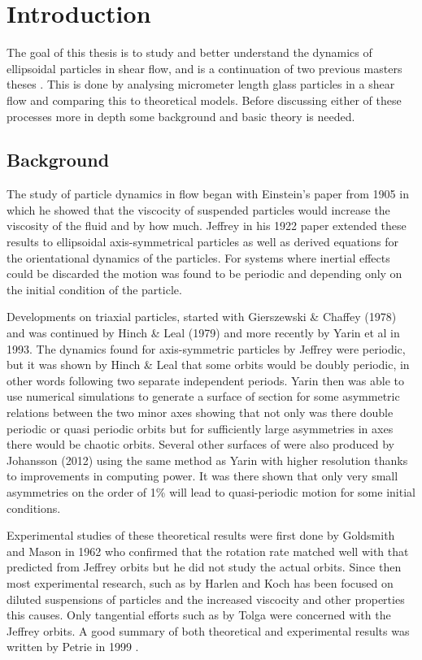 \section{Introduction}
The goal of this thesis is to study and better understand the dynamics of ellipsoidal particles in shear flow, and is a continuation of two previous masters theses \cite{AntonThesis, JonasThesis}. This is done by analysing micrometer length glass particles in a shear flow and comparing this to theoretical models. Before discussing either of these processes more in depth some background and basic theory is needed.

\subsection{Background}
The study of particle dynamics in flow began with Einstein's paper from 1905 \cite{Einstein} in which he showed that the viscocity of suspended particles would increase the viscosity of the fluid and by how much. Jeffrey in his 1922 paper \cite{Jeffrey} extended these results to ellipsoidal axis-symmetrical particles as well as derived equations for the orientational dynamics of the particles. For systems where inertial effects could be discarded the motion was found to be periodic and depending only on the initial condition of the particle.

Developments on triaxial particles, started with Gierszewski \& Chaffey (1978)\cite{Chaffey} and was continued by Hinch \& Leal (1979)\cite{Leal} and more recently by Yarin et al in 1993\cite{Yarin}. 
The dynamics found for axis-symmetric particles by Jeffrey were periodic, but it was shown by Hinch \& Leal that some orbits would be doubly periodic, in other words following two separate independent periods. 
Yarin then was able to use numerical simulations to generate a surface of section \cite{SurfaceOfSection} for some asymmetric relations between the two minor axes showing that not only was there double periodic or quasi periodic orbits but for sufficiently large asymmetries in axes there would be chaotic orbits. 
Several other surfaces of were also produced by Johansson (2012)\cite{AntonThesis} using the same method as Yarin with higher resolution thanks to improvements in computing power. It was there shown that only very small asymmetries on the order of 1\% will lead to quasi-periodic motion for some initial conditions.

Experimental studies of these theoretical results were first done by Goldsmith and Mason in 1962\cite{Mason} who confirmed that the rotation rate matched well with that predicted from Jeffrey orbits but he did not study the actual orbits. Since then most experimental research, such as by Harlen and Koch\cite{fibersspension} has been focused on diluted suspensions of particles and the increased viscocity and other properties this causes. Only tangential efforts such as by Tolga\cite{Tolga} were concerned with the Jeffrey orbits. A good summary of both theoretical and experimental results was written by Petrie in 1999 \cite{Petrie}.

